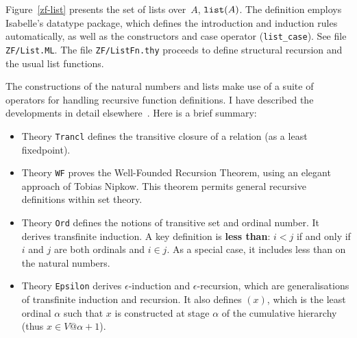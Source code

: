 Figure~\ref{zf-list} presents the set of lists over~$A$, ${\tt list}(A)$.
The definition employs Isabelle's datatype package, which defines the
introduction and induction rules automatically, as well as the constructors
and case operator (\verb|list_case|).  See file {\tt ZF/List.ML}.
The file {\tt ZF/ListFn.thy} proceeds to define structural
recursion and the usual list functions.

The constructions of the natural numbers and lists make use of a suite of
operators for handling recursive function definitions.  I have described
the developments in detail elsewhere~\cite{paulson-set-II}.  Here is a brief
summary:
\begin{itemize}
  \item Theory {\tt Trancl} defines the transitive closure of a relation
    (as a least fixedpoint).

  \item Theory {\tt WF} proves the Well-Founded Recursion Theorem, using an
    elegant approach of Tobias Nipkow.  This theorem permits general
    recursive definitions within set theory.

  \item Theory {\tt Ord} defines the notions of transitive set and ordinal
    number.  It derives transfinite induction.  A key definition is {\bf
      less than}: $i<j$ if and only if $i$ and $j$ are both ordinals and
    $i\in j$.  As a special case, it includes less than on the natural
    numbers.

  \item Theory {\tt Epsilon} derives $\epsilon$-induction and
    $\epsilon$-recursion, which are generalisations of transfinite
    induction and recursion.  It also defines $(x)$, which is the
    least ordinal $\alpha$ such that $x$ is constructed at stage $\alpha$
    of the cumulative hierarchy (thus $x\in V@{\alpha+1}$).
\end{itemize}

